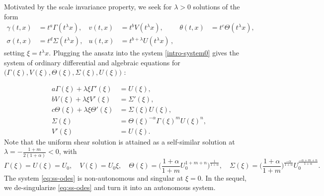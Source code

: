 \documentclass[a4paper,11pt]{article}
\theoremstyle{remark}
\begin{document}
Motivated by the scale invariance property, we seek for $\lambda > 0$ solutions of the form
\begin{equation}\label{eq:ORItoCAP}
\begin{aligned}
 \gamma(t,x) &= t^a\Gamma(t^\lambda x), & v(t,x) &= t^b V(t^\lambda x), &\theta(t,x) &= t^c \Theta(t^\lambda x),\\
 \sigma(t,x) &= t^d \Sigma(t^\lambda x), & u(t,x) &= t^{b+\lambda} U(t^\lambda x) \, , 
\end{aligned}
\end{equation}
setting $\xi = t^\lambda x$. Plugging the ansatz into the system \eqref{intro-system0} gives the system of ordinary differential and algebraic equations for $\big(\Gamma(\xi), V(\xi), \Theta(\xi), \Sigma(\xi), U(\xi)\big)$ :

\begin{equation}
\begin{aligned}
 a \Gamma(\xi) + \lambda \xi \Gamma'(\xi) &= U(\xi),\\
 b V(\xi) + \lambda \xi V'(\xi) &= \Sigma'(\xi),\\
 c \Theta(\xi) + \lambda \xi \Theta'(\xi)&=\Sigma(\xi) U(\xi),\\
 \Sigma(\xi) &= \Theta(\xi)^{-\alpha} \Gamma(\xi)^m U(\xi)^n,\\
 V'(\xi)&=U(\xi).
\end{aligned} \label{eq:ss-odes}
\end{equation}
Note that the uniform shear solution is attained as a self-similar solution at $\lambda = -\frac{1+m}{2(1+\alpha)}<0$, with
\begin{equation*}
 \Gamma(\xi) = U(\xi)=U_0, \quad V(\xi) = U_0\xi, \quad  \Theta(\xi) = \Big( \frac{1+\alpha}{1+m} U_0^{1+m+n}\Big)^{\frac{1}{1+\alpha}}, \quad \Sigma(\xi) = \Big(\frac{1+\alpha}{1+m}\Big)^{\frac{-\alpha}{1+\alpha}} U_0^{\frac{-\alpha+m+n}{1+\alpha}}.
\end{equation*}
The system \eqref{eq:ss-odes} is non-autonomous and  singular at $\xi=0$.
In the sequel, we de-singularize \eqref{eq:ss-odes} and turn it into an autonomous system.
\end{document}
